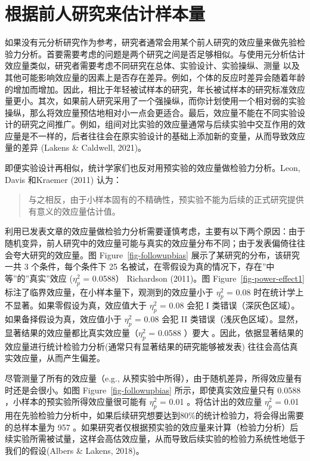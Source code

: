 \documentclass[
  letterpaper,
  DIV=11,
  numbers=noendperiod]{scrreprt}
\begin{document}
\hypertarget{ux6839ux636eux524dux4ebaux7814ux7a76ux6765ux4f30ux8ba1ux6837ux672cux91cf}{%
\section{根据前人研究来估计样本量}\label{ux6839ux636eux524dux4ebaux7814ux7a76ux6765ux4f30ux8ba1ux6837ux672cux91cf}}

如果没有元分析研究作为参考，研究者通常会用某个前人研究的效应量来做先验检验力分析。首要需要考虑的问题是两个研究之间是否足够相似。与使用元分析估计效应量类似，研究者需要考虑不同研究在总体、实验设计、实验操纵、测量
以及其他可能影响效应量的因素上是否存在差异。例如，个体的反应时差异会随着年龄的增加而增加。因此，相比于年轻被试样本的研究，年长被试样本的研究标准效应量更小。其次，如果前人研究采用了一个强操纵，而你计划使用一个相对弱的实验操纵，那么将效应量预估地相对小一点会更适合。最后，效应量不能在不同实验设计的研究之间推广。例如，组间对比实验的效应量通常与后续实验中交互作用的效应量是不一样的，后者往往会在原实验设计的基础上添加新的变量，从而导致效应量的差异
(Lakens \& Caldwell, 2021)。

即便实验设计再相似，统计学家们也反对用预实验的效应量做检验力分析。Leon,
Davis 和Kraemer (2011) 认为：

\begin{quote}
与之相反，由于小样本固有的不精确性，预实验不能为后续的正式研究提供有意义的效应量估计值。
\end{quote}

利用已发表文章的效应量做检验力分析需要谨慎考虑，主要有以下两个原因：由于随机变异，前人研究中的效应量可能与真实的效应量分布不同；由于发表偏倚往往会夸大研究的效应量。图
Figure~\ref{fig-followupbias} 展示了某研究的分布，该研究一共 3
个条件，每个条件下 25
名被试，在零假设为真的情况下，存在''中等''的''真实''效应 (\(\eta_p^2\) =
0.0588） Richardson (2011)。图 Figure~\ref{fig-power-effect1}
标注了临界效应量，在小样本量下，观测到的效应量小于 \(\eta_p^2\) = 0.08
时在统计学上不显著。如果零假设为真，效应值大于 \(\eta_p^2\) = 0.08 会犯
I 类错误（深灰色区域）。如果备择假设为真，效应值小于 \(\eta_p^2\) = 0.08
会犯 II
类错误（浅灰色区域）。显然，显著结果的效应量都比真实效应量（\(\eta_p^2\)
= 0.0588 ）要大
。因此，依据显著结果的效应量进行统计检验力分析(通常只有显著结果的研究能够被发表)
往往会高估真实效应量，从而产生偏差。

尽管测量了所有的效应量（e.g.,
从预实验中所得），由于随机差异，所得效应量有时还是会很小。如图
Figure~\ref{fig-followupbias} 所示，即使真实效应量只有 0.0588
，小样本的预实验所得效应量很可能有 \(\eta_p^2\) = 0.01
。将估计出的效应量 \(\eta_p^2\) = 0.01
用在先验检验力分析中，如果后续研究想要达到80\%的统计检验力，将会得出需要的总样本量为
957
。如果研究者仅根据预实验的效应量来计算（检验力分析）后续实验所需被试量，这样会高估效应量，从而导致后续实验的检验力系统性地低于我们的假设(Albers
\& Lakens, 2018)。
\end{document}
